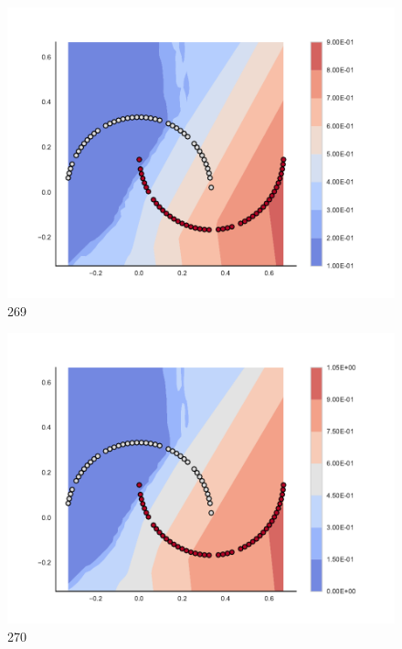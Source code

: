 \begin{subfigure}[b]{0.09\textwidth}
    \includegraphics[clip, trim=2.35cm 1.75cm 4.5cm 0cm,width=\textwidth]{img/convergence/269.pdf}
    \caption{269}
    \label{fig:convergence_269}
\end{subfigure}
%
\begin{subfigure}[b]{0.09\textwidth}
    \includegraphics[clip, trim=2.35cm 1.75cm 4.5cm 0cm,width=\textwidth]{img/convergence/270.pdf}
    \caption{270}
    \label{fig:convergence_270}
\end{subfigure}
%
